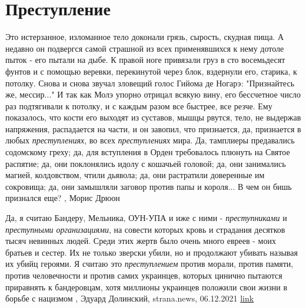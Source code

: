  
 
 
 
 
\chapter{Преступление}
\label{sec:slova.prestuplenie}

Это истерзанное, изломанное тело доконали грязь, сырость, скудная пища. А
недавно он подвергся самой страшной из всех применявшихся к нему дотоле
пыток - его пытали на дыбе. К правой ноге привязали груз в сто восемьдесят
фунтов и с помощью веревки, перекинутой через блок, вздернули его, старика, к
потолку. Снова и снова звучал зловещий голос Гийома де Ногарэ: "Признайтесь
же, мессир..." И так как Молэ упорно отрицал всякую вину, его бессчетное
число раз подтягивали к потолку, и с каждым разом все быстрее, все резче. Ему
показалось, что кости его выходят из суставов, мышцы рвутся, тело, не
выдержав напряжения, распадается на части, и он завопил, что признается,
да, признается в любых \emph{преступлениях}, во всех \emph{преступлениях} мира. Да,
тамплиеры предавались содомскому греху; да, для вступления в Орден
требовалось плюнуть на Святое распятие; да, они поклонялись идолу с
кошачьей головой; да, они занимались магией, колдовством, чтили дьявола;
да, они растратили доверенные им сокровища; да, они замышляли заговор против
папы и короля... В чем он бишь признался еще?
, Морис Дрюон

Да, я считаю Бандеру, Мельника, ОУН-УПА и иже с ними - \emph{преступниками} и
\emph{преступными организациями}, на совести которых кровь и страдания десятков
тысяч невинных людей.  Среди этих жертв было очень много евреев - моих братьев
и сестер. Их не только зверски убили, но и продолжают убивать называя их убийц
героями.  Я считаю это \emph{преступлением} против морали, против памяти,
против человечности и против самих украинцев, которых цинично пытаются
приравнять к бандеровцам, хотя миллионы украинцев положили свои жизни в борьбе
с нацизмом
, 
Эдуард Долинский, strana.news, 06.12.2021
\href{https://strana.news/opinions/365623-za-neljubov-k-bandere-von-za-predely-ukrainy.html}{link}
